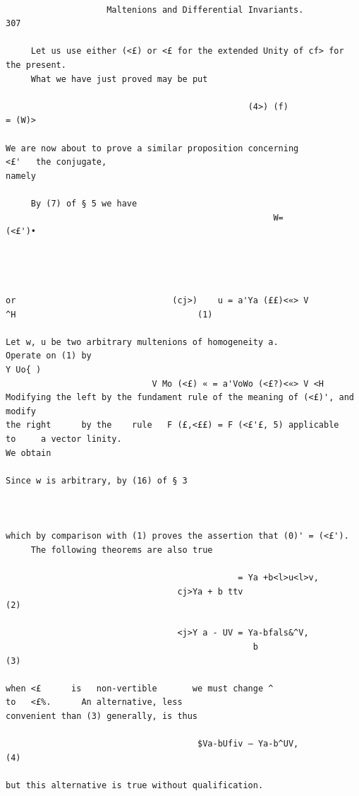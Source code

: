 \documentclass[10pt]{article}
\begin{document}
\begin{verbatim}

                    Maltenions and Differential Invariants.                                                         307

     Let us use either (<£) or <£ for the extended Unity of cf> for the present.
     What we have just proved may be put

                                                (4>) (f)              = (W)>

We are now about to prove a similar proposition concerning                                           <£'   the conjugate,
namely

     By (7) of § 5 we have
                                                     W=                (<£')•




or                               (cj>)    u = a'Ya (££)<«> V                    ^H                                    (1)

Let w, u be two arbitrary multenions of homogeneity a.                                           Operate on (1) by
Y Uo{ )
                             V Mo (<£) « = a'VoWo (<£?)<«> V <H
Modifying the left by the fundament rule of the meaning of (<£)', and modify
the right      by the    rule   F (£,<££) = F (<£'£, 5) applicable                              to     a vector linity.
We obtain

Since w is arbitrary, by (16) of § 3



which by comparison with (1) proves the assertion that (0)' = (<£').
     The following theorems are also true

                                              = Ya +b<l>u<l>v,
                                  cj>Ya + b ttv                                                                       (2)

                                  <j>Y a - UV = Ya-bfals&^V,
                                                 b                                                                    (3)

when <£      is   non-vertible       we must change ^                           to   <£%.      An alternative, less
convenient than (3) generally, is thus

                                      $Va-bUfiv — Ya-b^UV,                                                            (4)

but this alternative is true without qualification.


\end{verbatim}
\end{document}
